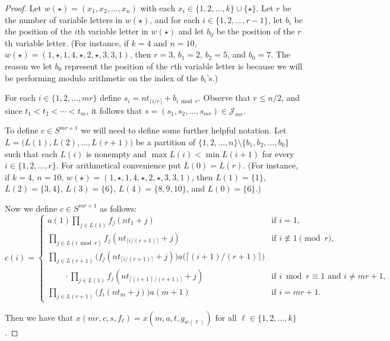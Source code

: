 \documentclass[12pt,showtrims]{memoir}
\theoremstyle{plain}
\theoremstyle{definition}
\newcommand{\calJ}{\mathcal{J}}
\begin{document}
\begin{proof}
  Let $w(\star) = (x_1, x_2, \ldots, x_n)$ with each $x_i \in \{1, 2, \ldots, k\} \cup \{\star\}$. 
  Let $r$ be the number of variable letters in $w(\star)$, and for each $i \in \{1, 2, \ldots, r-1\}$, let $b_i$ be the position of the \mbox{$i$th} variable letter in $w(\star)$ and let $b_0$ be the position of the \mbox{$r$th} variable letter.
  (For instance, if $k = 4$ and $n = 10$, $w(\star) = (1, \star, 1, 4, \star, 2, \star, 3, 3, 1)$, then $r = 3$, $b_1 = 2$, $b_2 = 5$, and $b_0 = 7$.
  The reason we let $b_0$ represent the position of the \mbox{$r$th} variable letter is because we will be performing modulo arithmetic on the index of the $b_i$'s.)

  For each $i \in \{1, 2, \ldots, mr\}$ define $s_i = nt_{\lceil i/r \rceil} + b_{i \bmod r}$.
  Observe that $r \le n/2$, and since $t_1 < t_2 < \cdots < t_m$, it follows that $s = (s_1, s_2, \ldots, s_{mr}) \in \calJ_{mr}$.

  To define $c \in S^{mr+1}$ we will need to define some further helpful notation. 
  Let $L = \bigl( L(1), L(2), \ldots, L(r+1) \bigr)$ be a partition of $\{1, 2, \ldots, n\} \setminus \{b_1, b_2, \ldots, b_0\}$ such that each $L(i)$ is nonempty and $\max L(i) < \min L(i+1)$ for every $i \in \{1, 2, \ldots, r\}$. 
  For arithmetical convenience put $L(0) = L(r)$. 
  (For instance, if $k = 4$, $n = 10$, $w(\star) = (1, \star, 1, 4, \star, 2, \star, 3, 3, 1)$, then $L(1) = \{1\}$, $L(2) = \{3,4\}$, $L(3) = \{6\}$, $L(4) = \{8, 9, 10\}$, and $L(0) = \{6\}$.)

  Now we define $c \in S^{mr+1}$ as follows:
  \[
    c(i) = 
    \begin{cases}
      a(1)\prod_{j \in L(1)} f_j(nt_1 + j) & \mbox{if $i = 1$,} \\
      \prod_{j \in L(i \bmod r)}  f_j(nt_{\lceil i/(r+1) \rceil} + j) & \mbox{if $i \not\equiv 1 \pmod r$, }\\
      \prod_{j \in L(r+1)} \bigl( f_j(nt_{\lceil i/(r+1) \rceil} + j) \bigr) a\bigl( \lceil (i+1)/(r+1) \rceil \bigr) & \\
      \hspace{2em} \cdot\prod_{j \in L(1)} f_j(nt_{\lceil (i+1)/(r+1) \rceil} + j) & \mbox{if $i \bmod r \equiv 1$ and $i \ne mr +1$, }\\
      \prod_{j \in L(r+1)} \bigr( f_i(nt_m + j) \bigr) a(m+1) & \mbox{if $i = mr + 1$.}
    \end{cases}
  \]

  Then we have that $x(mr, c, s, f_\ell) = x(m, a, t, g_{w(\ell)})$ for all $\ell \in \{1, 2, \ldots, k\}$.
\end{proof}
\end{document}
